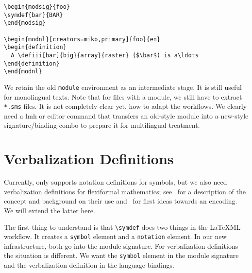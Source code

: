 \documentclass{bluenote}
\def\latexml{{\LaTeX}ML\xspace}
\def\lmh{\textsf{lmh}\xspace}
\def\lstomdoc{\lstinline[language={[1.3]OMDoc}]}
\begin{document}
\begin{lstlisting}[caption=New-Style \protect\sTeX,label=lst:newmods]
\begin{modsig}{foo}
\symdef{bar}{BAR}
\end{modsig}

\begin{modnl}[creators=miko,primary]{foo}{en}
\begin{definition}
  A \defiii[bar]{big}{array}{raster} ($\bar$) is a\ldots
\end{definition}
\end{modnl}
\end{lstlisting}
We retain the old \lstinline|module| environment as an intermediate stage. It is still
useful for monolingual texts. Note that for files with a module, we still have to extract
\lstinline|*.sms| files. It is not completely clear yet, how to adapt the workflows. We
clearly need a \lmh or editor command that transfers an old-style module into a new-style
signature/binding combo to prepare it for multilingual treatment.

\section{Verbalization Definitions}

Currently, \sTeX only supports notation definitions for symbols, but we also need
verbalization definitions for flexiformal mathematics; see~\cite{Kohlhase:dmesmgm14} for a
description of the concept and background on their use and~\cite[section
5]{Kohlhase:dmsmglom14} for first ideas towards an \sTeX encoding. We will extend the
latter here.

The first thing to understand is that \lstinline|\symdef| does two things in the \latexml
workflow. It creates a \lstomdoc|symbol| element and a
\lstomdoc|notation| element. In our new infrastructure, both go into the module
signature. For verbalization definitions the situation is different. We want the
\lstomdoc|symbol| element in the module signature and the verbalization definition in the
language bindings.
\end{document}
